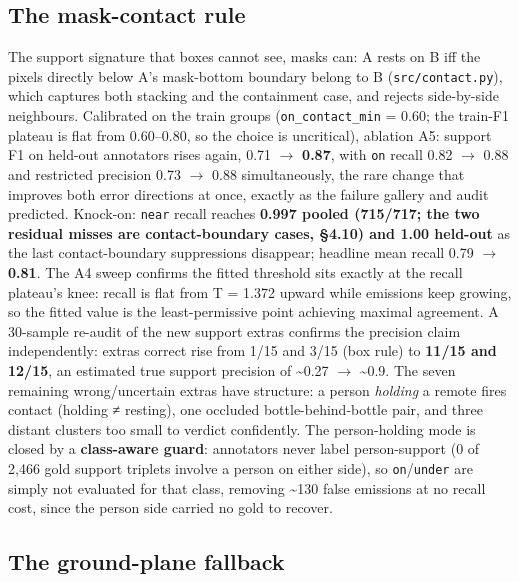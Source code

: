 \subsection{The mask-contact rule}

The support signature that boxes cannot see, masks can: A rests on B iff the pixels directly below A's mask-bottom boundary belong to B (\texttt{src/contact.py}), which captures both stacking and the containment case, and rejects side-by-side neighbours. Calibrated on the train groups (\texttt{on\_contact\_min} = 0.60; the train-F1 plateau is flat from 0.60--0.80, so the choice is uncritical), ablation A5: support F1 on held-out annotators rises again, 0.71 $\rightarrow$ \textbf{0.87}, with \texttt{on} recall 0.82 $\rightarrow$ 0.88 and restricted precision 0.73 $\rightarrow$ 0.88 simultaneously, the rare change that improves both error directions at once, exactly as the failure gallery and audit predicted. Knock-on: \texttt{near} recall reaches \textbf{0.997 pooled (715/717; the two residual misses are contact-boundary cases, \S4.10) and 1.00 held-out} as the last contact-boundary suppressions disappear; headline mean recall 0.79 $\rightarrow$ \textbf{0.81}. The A4 sweep confirms the fitted threshold sits exactly at the recall plateau's knee: recall is flat from T = 1.372 upward while emissions keep growing, so the fitted value is the least-permissive point achieving maximal agreement. A 30-sample re-audit of the new support extras confirms the precision claim independently: extras correct rise from 1/15 and 3/15 (box rule) to \textbf{11/15 and 12/15}, an estimated true support precision of \textasciitilde{}0.27 $\rightarrow$ \textasciitilde{}0.9. The seven remaining wrong/uncertain extras have structure: a person \textit{holding} a remote fires contact (holding ≠ resting), one occluded bottle-behind-bottle pair, and three distant clusters too small to verdict confidently. The person-holding mode is closed by a \textbf{class-aware guard}: annotators never label person-support (0 of 2,466 gold support triplets involve a person on either side), so \texttt{on}/\texttt{under} are simply not evaluated for that class, removing \textasciitilde{}130 false emissions at no recall cost, since the person side carried no gold to recover.

\subsection{The ground-plane fallback}

